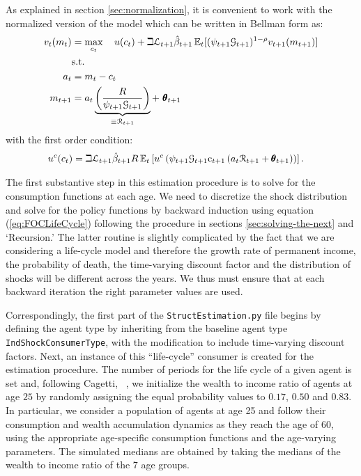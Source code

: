 \documentclass[titlepage, headings=optiontotocandhead]{Resources/texmf-local/tex/latex/econtex}
\begin{document}
As explained in section \ref{sec:normalization}, it is convenient to work with the normalized version of the model which can be written in Bellman form as:
  \begin{equation*}\begin{gathered}\begin{aligned}
        v_{t}(m_{t})  & = \max_{{c}_{t}}~~~ u(c_{t})+\beth\mathcal{L}_{t+1}\hat{\beta}_{t+1}
        \operatorname{\mathbb{E}}_{t}[(\psi_{t+1}\mathcal{G}_{t+1})^{1-\rho}v_{t+1}(m_{t+1})]   \\
        & \text{s.t.}   \nonumber \\
        a_{t}    & = m_{t}-c_{t} \nonumber
        \\      m_{t+1}  & = a_{t}\underbrace{\left(\frac{R}{\psi_{t+1}\mathcal{G}_{t+1}}\right)}_{\equiv \mathcal{R}_{t+1}}+ ~\pmb{\theta}_{t+1}
      \end{aligned}\end{gathered}\end{equation*}
with the first order condition:
  \begin{equation}\begin{gathered}\begin{aligned}
        u^{c}(c_{t}) & = \beth\mathcal{L}_{t+1}\hat{\beta}_{t+1}R \operatorname{\mathbb{E}}_{t}\left[u^{c}\left(\psi_{t+1}\mathcal{G}_{t+1}\mathrm{c}_{t+1}\left(a_{t}\mathcal{R}_{t+1}+\pmb{\theta}_{t+1}\right)\right)\right]\label{eq:FOCLifeCycle}
        .
      \end{aligned}\end{gathered}\end{equation}

The first substantive {step} in this estimation procedure is
to solve for the consumption functions at each age. We need to
discretize the shock distribution and solve for the policy
functions by backward induction using equation (\ref{eq:FOCLifeCycle})
following the procedure in sections \ref{sec:solving-the-next} and
`Recursion.' The latter routine
is slightly complicated by the fact that we are considering a
life-cycle model and therefore the growth rate of permanent income,
the probability of death, the time-varying discount factor and the
distribution of shocks will be different across the years. We thus
must ensure that at each backward iteration the right parameter
values are used.

Correspondingly, the first part of the \texttt{StructEstimation.py} file begins by defining the agent type by inheriting from the baseline agent type \texttt{IndShockConsumerType}, with the modification to include time-varying discount factors. Next, an instance of this ``life-cycle'' consumer is created for the estimation procedure.  The number of periods for the life cycle of a given agent is set and, following Cagetti, ~\citeyearpar{cagettiWprofiles}, we initialize the wealth to income ratio of agents at age $25$ by randomly assigning the equal probability values to $0.17$, $0.50$ and $0.83$. In particular, we consider a population of agents at age 25 and follow their consumption and wealth accumulation dynamics as they reach the age of $60$, using the appropriate age-specific consumption functions and the age-varying parameters. The simulated medians are obtained by taking the medians of the wealth to income ratio of the $7$ age groups.
\end{document}
